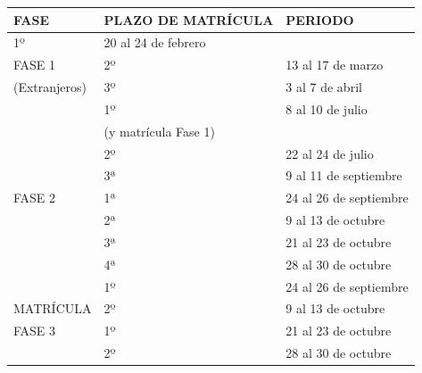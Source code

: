 \documentclass{article}
\begin{document}
\begin{itemize}
\begin{itemize}
\begin{scriptsize}
                  \vspace{0.4cm}
                  \begin{table}[h!]\centering\renewcommand{\arraystretch}{1.3}
                    \begin{tabular}{|p{}|p{}|p{}|}\hline
                      FASE          & PLAZO DE MATRÍCULA   & PERIODO                \\\hline
                      1º            & 20 al 24 de febrero  &                        \\\hline
                      FASE 1        & 2º                   & 13 al 17 de marzo      \\\hline
                      (Extranjeros) & 3º                   & 3 al 7 de abril        \\\hline
                                    & 1º                   & 8 al 10 de julio       \\\hline
                                    & (y matrícula Fase 1) &                        \\\hline
                                    & 2º                   & 22 al 24 de julio      \\\hline
                                    & 3ª                   & 9 al 11 de septiembre  \\\hline
                      FASE 2        & 1ª                   & 24 al 26 de septiembre \\\hline
                                    & 2ª                   & 9 al 13 de octubre     \\\hline
                                    & 3ª                   & 21 al 23 de octubre    \\\hline
                                    & 4ª                   & 28 al 30 de octubre    \\\hline
                                    & 1º                   & 24 al 26 de septiembre \\\hline
                      MATRÍCULA     & 2º                   & 9 al 13 de octubre     \\\hline
                      FASE 3        & 1º                   & 21 al 23 de octubre    \\\hline
                                    & 2º                   & 28 al 30 de octubre    \\\hline
                    \end{tabular}\end{table}
                  \vspace{0.4cm}


\end{scriptsize}
\end{itemize}
\end{itemize}
\end{document}
